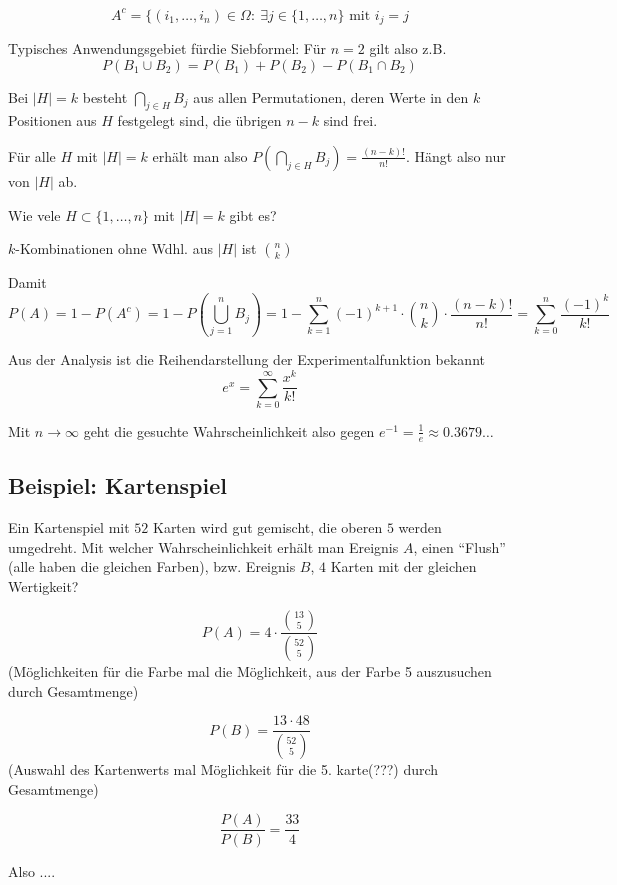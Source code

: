 \[ A^c = \{ (i_1,\ldots,i_n) \in \Omega:\ \exists j \in \{1,\ldots, n\} \text{ mit } i_j=j \]

Typisches Anwendungsgebiet fürdie Siebformel: %
Für $n=2$ gilt also z.B.
\[ P(B_1 \cup B_2) = P(B_1) + P(B_2) - P(B_1\cap B_2) \]

Bei $|H| = k$ besteht $\bigcap_{j\in H}B_j$ aus allen Permutationen, deren Werte in den $k$ Positionen aus $H$ festgelegt sind, die übrigen $n-k$ sind frei.

Für alle $H$ mit $|H|=k$ erhält man also $P\left(\bigcap_{j\in H} B_j\right) = \frac{(n-k)!}{n!}$.
Hängt also nur von $|H|$ ab.

Wie vele $H \subset \{ 1,\ldots,n \}$ mit $|H|=k$ gibt es?

$k$-Kombinationen ohne Wdhl. aus $|H|$ ist $n \choose k$

Damit 
\[P(A) = 1- P(A^c) = 1-P\left(\bigcup_{j=1}^n B_j\right) = 1-\sum_{k=1}^n(-1)^{k+1} \cdot {n \choose k} \cdot \frac{(n-k)!}{n!} = \sum_{k=0}^n \frac{(-1)^k}{k!}\] %

Aus der Analysis ist die Reihendarstellung der Experimentalfunktion bekannt
\[e^x = \sum_{k=0}^\infty \frac{x^k}{k!}\]

Mit $n\rightarrow\infty$ geht die gesuchte Wahrscheinlichkeit also gegen $e^{-1} = \frac{1}{e} \approx 0.3679\ldots$

\subsection{Beispiel: Kartenspiel}

Ein Kartenspiel mit $52$ Karten wird gut gemischt, die oberen $5$ werden umgedreht.
Mit welcher Wahrscheinlichkeit erhält man Ereignis $A$, einen ``Flush'' (alle haben die gleichen Farben), bzw. Ereignis $B$, $4$ Karten mit der gleichen Wertigkeit?

\[P(A) = 4 \cdot \frac{{13 \choose 5}}{{52 \choose 5}} \] (Möglichkeiten für die Farbe mal die Möglichkeit, aus der Farbe 5 auszusuchen durch Gesamtmenge)

\[ P(B) = \frac{13 \cdot 48}{{52 \choose 5}} \]
(Auswahl des Kartenwerts mal Möglichkeit für die 5. karte(???) durch Gesamtmenge)

\[ \frac{P(A)}{P(B)} = \frac{33}{4} \]

Also ....